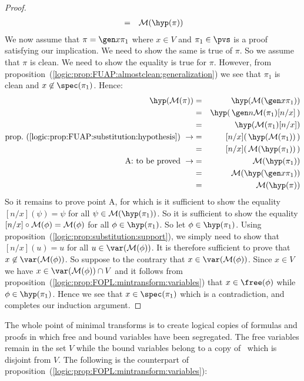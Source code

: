 \begin{proof}
\begin{eqnarray*}
    &=&{\cal M}(\hyp(\pi))\\
    \end{eqnarray*}
We now assume that $\pi=\gen x\pi_{1}$ where $x\in V$ and
$\pi_{1}\in\pvs$ is a proof satisfying our implication. We need to
show the same is true of $\pi$. So we assume that $\pi$ is clean. We
need to show the equality is true for $\pi$. However, from
proposition~(\ref{logic:prop:FUAP:almostclean:generalization}) we
see that $\pi_{1}$ is clean and $x\not\in\spec(\pi_{1})$. Hence:
    \begin{eqnarray*}
    \hyp({\cal M}(\pi))&=&\hyp({\cal M}(\gen x\pi_{1}))\\
    &=&\hyp(\,\gen n{\cal M}(\pi_{1})[n/x]\,)\\
    &=&\hyp({\cal M}(\pi_{1})[n/x])\\
    \mbox{prop.~(\ref{logic:prop:FUAP:substitution:hypothesis})}\ \rightarrow
    &=&[n/x](\,\hyp({\cal M}(\pi_{1}))\,)\\
    &=&[n/x](\,{\cal M}(\hyp(\pi_{1}))\,)\\
    \mbox{A: to be proved}\ \rightarrow
    &=&{\cal M}(\hyp(\pi_{1}))\\
    &=&{\cal M}(\hyp(\gen x\pi_{1}))\\
    &=&{\cal M}(\hyp(\pi))\\
    \end{eqnarray*}
So it remains to prove point A, for which is it sufficient to show
the equality $[n/x](\psi)=\psi$ for all $\psi\in{\cal
M}(\hyp(\pi_{1}))$. So it is sufficient to show the equality
$[n/x]\circ{\cal M}(\phi)={\cal M}(\phi)$ for all
$\phi\in\hyp(\pi_{1})$. So let $\phi\in\hyp(\pi_{1})$. Using
proposition~(\ref{logic:prop:substitution:support}), we simply need
to show that $[n/x](u)=u$ for all $u\in\var({\cal M}(\phi))$. It is
therefore sufficient to prove that $x\not\in\var({\cal M}(\phi))$.
So suppose to the contrary that $x\in\var({\cal M}(\phi))$. Since
$x\in V$ we have $x\in\var({\cal M}(\phi))\cap V$ and it follows
from proposition~(\ref{logic:prop:FOPL:mintransform:variables}) that
$x\in\free(\phi)$ while $\phi\in\hyp(\pi_{1})$. Hence we see that
$x\in\spec(\pi_{1})$ which is a contradiction, and completes our
induction argument.
\end{proof}

The whole point of minimal transforms is to create logical copies of
formulas and proofs in which free and bound variables have been
segregated. The free variables remain in the set $V$ while the bound
variables belong to a copy of \N\ which is disjoint from $V$. The
following is the counterpart of
proposition~(\ref{logic:prop:FOPL:mintransform:variables}):

